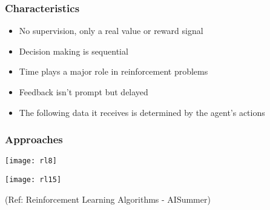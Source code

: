 


\begin{frame}[fragile]\frametitle{Characteristics}
\begin{itemize}
\item No supervision, only a real value or reward signal
\item Decision making is sequential
\item Time plays a major role in reinforcement problems
\item Feedback isn't prompt but delayed
\item The following data it receives is determined by the agent's actions
\end{itemize}
\end{frame}


\begin{frame}[fragile]\frametitle{Approaches}

\begin{center}
\texttt{[image: rl8]}

\texttt{[image: rl15]}

\end{center}

{\tiny (Ref: Reinforcement Learning Algorithms - AISummer)} 


\end{frame}


